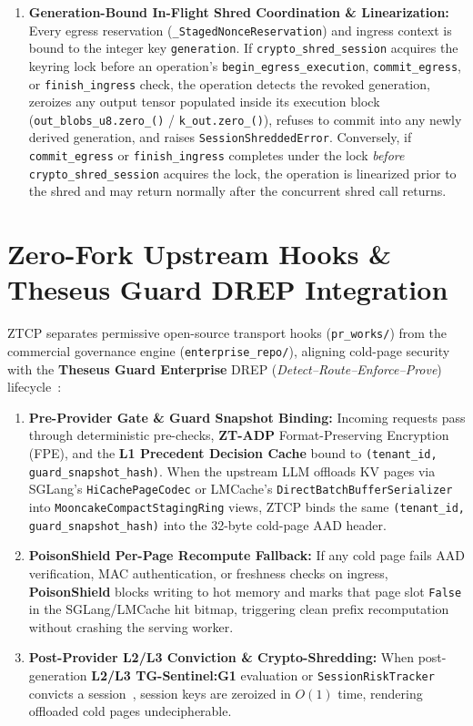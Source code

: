 \documentclass[10pt,twocolumn]{article}
\begin{document}
\begin{enumerate}
    \item \textbf{Generation-Bound In-Flight Shred Coordination \& Linearization:} Every egress reservation (\texttt{\_Staged\allowbreak Nonce\allowbreak Reservation}) and ingress context is bound to the integer key \texttt{generation}. If \texttt{crypto\_\allowbreak shred\_\allowbreak session} acquires the keyring lock before an operation's \texttt{begin\_\allowbreak egress\_\allowbreak execution}, \texttt{commit\_\allowbreak egress}, or \texttt{finish\_\allowbreak ingress} check, the operation detects the revoked generation, zeroizes any output tensor populated inside its execution block (\texttt{out\_blobs\_u8.zero\_()} / \texttt{k\_out.zero\_()}), refuses to commit into any newly derived generation, and raises \texttt{Session\allowbreak Shredded\allowbreak Error}. Conversely, if \texttt{commit\_\allowbreak egress} or \texttt{finish\_\allowbreak ingress} completes under the lock \textit{before} \texttt{crypto\_\allowbreak shred\_\allowbreak session} acquires the lock, the operation is linearized prior to the shred and may return normally after the concurrent shred call returns.
\end{enumerate}

\section{Zero-Fork Upstream Hooks \& Theseus Guard DREP Integration}
ZTCP separates permissive open-source transport hooks (\texttt{pr\_works/}) from the commercial governance engine (\texttt{enterprise\_repo/}), aligning cold-page security with the \textbf{Theseus Guard Enterprise} DREP (\textit{Detect--Route--Enforce--Prove}) lifecycle~\cite{theseusguard2026patent,theseusguard2026g1}:
\begin{enumerate}
    \item \textbf{Pre-Provider Gate \& Guard Snapshot Binding:} Incoming requests pass through deterministic pre-checks, \textbf{ZT-ADP} Format-Preserving Encryption (FPE), and the \textbf{L1 Precedent Decision Cache} bound to \texttt{(tenant\_id, guard\_snapshot\_hash)}. When the upstream LLM offloads KV pages via SGLang's \texttt{HiCachePageCodec} or LMCache's \texttt{DirectBatchBufferSerializer} into \texttt{MooncakeCompactStagingRing} views, ZTCP binds the same \texttt{(tenant\_id, guard\_snapshot\_hash)} into the 32-byte cold-page AAD header.
    \item \textbf{PoisonShield Per-Page Recompute Fallback:} If any cold page fails AAD verification, MAC authentication, or freshness checks on ingress, \textbf{PoisonShield} blocks writing to hot memory and marks that page slot \texttt{False} in the SGLang/LMCache hit bitmap, triggering clean prefix recomputation without crashing the serving worker.
    \item \textbf{Post-Provider L2/L3 Conviction \& Crypto-Shredding:} When post-generation \textbf{L2/L3 TG-Sentinel:G1} evaluation or \texttt{SessionRiskTracker} convicts a session~\cite{theseusguard2026patent,theseusguard2026g1}, session keys are zeroized in $O(1)$ time, rendering offloaded cold pages undecipherable.
\end{enumerate}
\end{document}
